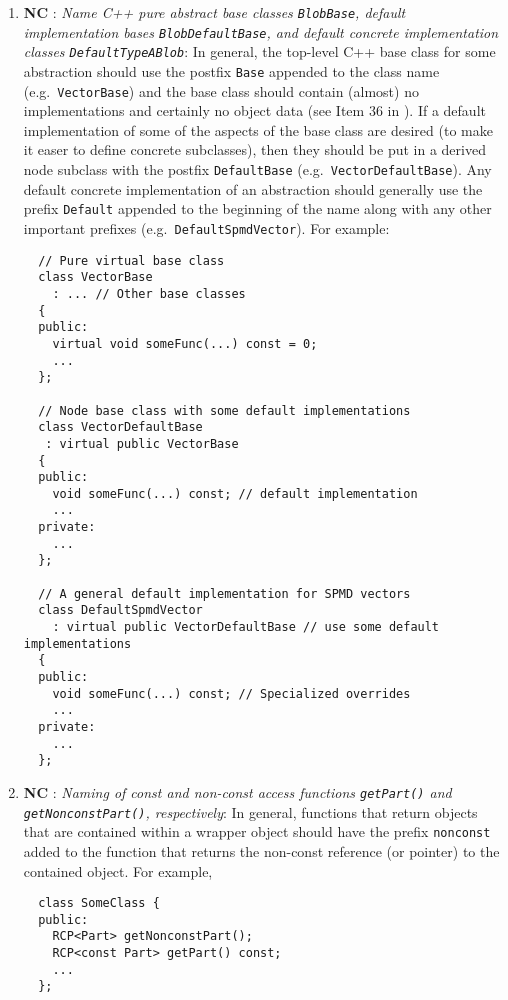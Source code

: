 \begin{enumerate}
{}\item{}\textbf{NC }:
{}\textit{Name C++ pure abstract base classes {}\texttt{BlobBase}, default
implementation bases {}\texttt{BlobDefaultBase}, and default concrete
implementation classes {}\texttt{DefaultTypeABlob}}: In general, the top-level
C++ base class for some abstraction should use the postfix {}\texttt{Base}
appended to the class name (e.g.\ {}\texttt{Vector\-Base}) and the base class
should contain (almost) no implementations and certainly no object data (see
Item 36 in {}\cite{C++CodingStandards05}).  If a default implementation of
some of the aspects of the base class are desired (to make it easer to define
concrete subclasses), then they should be put in a derived node subclass with
the postfix {}\texttt{DefaultBase} (e.g.\ {}\texttt{Vector\-Default\-Base}).
Any default concrete implementation of an abstraction should generally use the
prefix {}\texttt{Default} appended to the beginning of the name along with any
other important prefixes (e.g.\ {}\texttt{DefaultSpmdVector}).  For example:

{\small\begin{verbatim}
  // Pure virtual base class 
  class VectorBase
    : ... // Other base classes
  {
  public:
    virtual void someFunc(...) const = 0;
    ...
  };

  // Node base class with some default implementations
  class VectorDefaultBase
   : virtual public VectorBase
  {
  public:
    void someFunc(...) const; // default implementation
    ...
  private:
    ...
  };

  // A general default implementation for SPMD vectors
  class DefaultSpmdVector
    : virtual public VectorDefaultBase // use some default implementations
  {
  public:
    void someFunc(...) const; // Specialized overrides
    ...
  private:
    ...
  };
\end{verbatim}}

{}\item{}\textbf{NC }:
{}\textit{Naming of const and non-const access functions {}\texttt{getPart()}
and {}\texttt{getNonconstPart()}, respectively}: In general, functions that
return objects that are contained within a wrapper object should have the
prefix {}\texttt{nonconst} added to the function that returns the non-const
reference (or pointer) to the contained object.  For example,

{\small\begin{verbatim}
  class SomeClass {
  public:
    RCP<Part> getNonconstPart();
    RCP<const Part> getPart() const;
    ...
  };
\end{verbatim}}


\end{enumerate}
